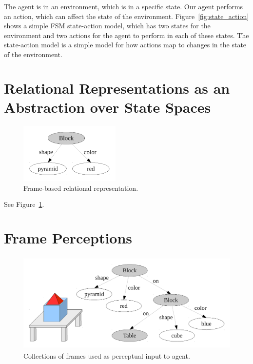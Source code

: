 The agent is in an environment, which is in a specific state.  Our
agent performs an action, which can affect the state of the
environment.  Figure~\ref{fig:state_action} shows a simple \ac{FSM}
state-action model, which has two states for the environment and two
actions for the agent to perform in each of these states.  The
state-action model is a simple model for how actions map to changes in
the state of the environment.

\section{Relational Representations as an Abstraction over State Spaces}

\begin{figure}[bth]
  \center
  \includegraphics[height=3cm]{gfx/frame_representation}
  \caption[Frame-based relational representation.]{Frame-based relational representation.}
  \label{fig:frame_representation}
\end{figure}

See Figure~\ref{fig:frame_representation}.


\section{Frame Perceptions}

\begin{figure}[bth]
  \center
  \includegraphics[height=5cm]{gfx/frame_perception}
  \caption[Collections of frames used as perceptual input to agent.]{Collections of frames used as perceptual input to agent.}
  \label{fig:frame_perception}
\end{figure}

